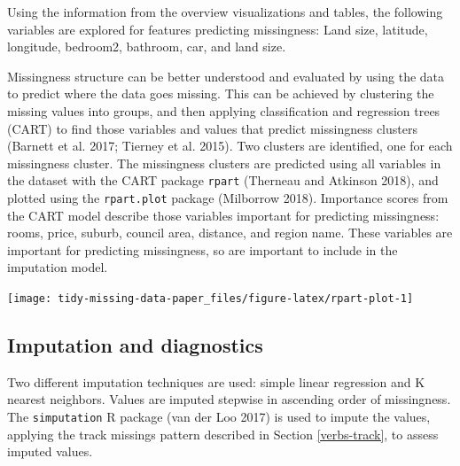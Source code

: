 \documentclass[]{article}
\let\origfigure\figure
\let\endorigfigure\endfigure
\renewenvironment{figure}[1][2] {
    \expandafter\origfigure\expandafter[H]
} {
    \endorigfigure
}
\theoremstyle{definition}
\theoremstyle{definition}
\theoremstyle{definition}
\theoremstyle{remark}
\begin{document}
Using the information from the overview visualizations and tables, the
following variables are explored for features predicting missingness:
Land size, latitude, longitude, bedroom2, bathroom, car, and land size.

Missingness structure can be better understood and evaluated by using
the data to predict where the data goes missing. This can be achieved by
clustering the missing values into groups, and then applying
classification and regression trees (CART) to find those variables and
values that predict missingness clusters (Barnett et al. 2017; Tierney
et al. 2015). Two clusters are identified, one for each missingness
cluster. The missingness clusters are predicted using all variables in
the dataset with the CART package \texttt{rpart} (Therneau and Atkinson
2018), and plotted using the \texttt{rpart.plot} package (Milborrow
2018). Importance scores from the CART model describe those variables
important for predicting missingness: rooms, price, suburb, council
area, distance, and region name. These variables are important for
predicting missingness, so are important to include in the imputation
model.

\begin{figure}

{\centering \texttt{[image: tidy-missing-data-paper\_files/figure-latex/rpart-plot-1]} 

}

\caption{Decision tree output predicting the clusters of missingness. Type of house, the year quarter, and year were important for predicting missingness cluster. The cluster with the most missingness was for quarters 1 and 4, for 2017 and 2018. Type of house, year, and year quarter are important features related to the missingness structure.}\label{fig:rpart-plot}
\end{figure}

\hypertarget{case-study-imp-diagnosis}{%
\subsection{Imputation and diagnostics}\label{case-study-imp-diagnosis}}

Two different imputation techniques are used: simple linear regression
and K nearest neighbors. Values are imputed stepwise in ascending order
of missingness. The \texttt{simputation} R package (van der Loo 2017) is
used to impute the values, applying the track missings pattern described
in Section \ref{verbs-track}, to assess imputed values.
\end{document}
